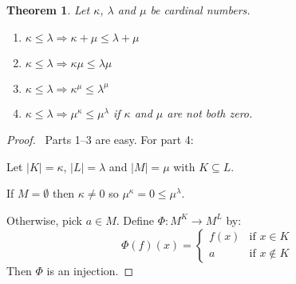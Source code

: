 \documentclass{article}
\let\qed\relax
\newtheorem{theorem}[axiom]{Theorem}
\theoremstyle{definition}
\begin{document}
    \begin{theorem}
        Let $\kappa$, $\lambda$ and $\mu$ be cardinal numbers.
        \begin{enumerate}
            \item $\kappa \leq \lambda \Rightarrow \kappa + \mu \leq \lambda + \mu$
            \item $\kappa \leq \lambda \Rightarrow \kappa \mu \leq \lambda \mu$
            \item $\kappa \leq \lambda \Rightarrow \kappa^\mu \leq \lambda^\mu$
            \item $\kappa \leq \lambda \Rightarrow \mu^\kappa \leq \mu^\lambda$ if $\kappa$ and $\mu$
            are not both zero.
        \end{enumerate}
    \end{theorem}

    \begin{proof}
        \pf\ Parts 1--3 are easy. For part 4:
        
        Let $|K| = \kappa$, $|L| = \lambda$ and $|M| = \mu$ with $K \subseteq L$.

        If $M = \emptyset$ then $\kappa \neq 0$ so $\mu^\kappa = 0 \leq \mu^\lambda$.

        Otherwise, pick $a \in M$. Define $\Phi : M^K \rightarrow M^L$ by:
        \[ \Phi(f)(x) = \begin{cases}
            f(x) & \text{if } x \in K \\
            a & \text{if } x \notin K
        \end{cases} \]
        Then $\Phi$ is an injection. \qed
    \end{proof}

    
\end{document}
